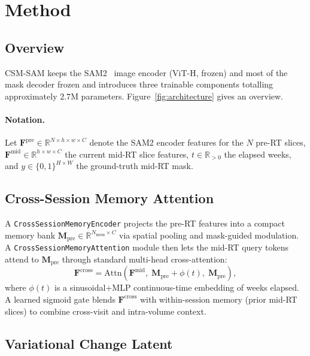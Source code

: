 \section{Method}
\label{sec:method}

\subsection{Overview}
\label{sec:method:overview}

CSM-SAM keeps the SAM2~\cite{ravi2024sam2} image encoder (ViT-H, frozen) and
most of the mask decoder frozen and introduces three trainable components
totalling approximately $2.7$M parameters.
Figure~\ref{fig:architecture} gives an overview.

\paragraph{Notation.}
Let $\mathbf{F}^{\text{pre}} \in \mathbb{R}^{N \times h \times w \times C}$
denote the SAM2 encoder features for the $N$ pre-RT slices,
$\mathbf{F}^{\text{mid}} \in \mathbb{R}^{h \times w \times C}$ the
current mid-RT slice features, $t \in \mathbb{R}_{>0}$ the elapsed weeks,
and $y \in \{0,1\}^{H \times W}$ the ground-truth mid-RT mask.

\subsection{Cross-Session Memory Attention}
\label{sec:method:csma}

A \texttt{CrossSessionMemoryEncoder} projects the pre-RT features into a
compact memory bank $\mathbf{M}_{\text{pre}} \in \mathbb{R}^{N_{\text{mem}} \times C}$
via spatial pooling and mask-guided modulation.  A
\texttt{CrossSessionMemoryAttention} module then lets the mid-RT query tokens
attend to $\mathbf{M}_{\text{pre}}$ through standard multi-head cross-attention:
\begin{equation}
  \mathbf{F}^{\text{cross}} = \mathrm{Attn}\!\left(
    \mathbf{F}^{\text{mid}},\;
    \mathbf{M}_{\text{pre}} + \phi(t),\;
    \mathbf{M}_{\text{pre}}
  \right),
\end{equation}
where $\phi(t)$ is a sinusoidal+MLP continuous-time embedding of weeks elapsed.
A learned sigmoid gate blends $\mathbf{F}^{\text{cross}}$ with within-session
memory (prior mid-RT slices) to combine cross-visit and intra-volume context.

\subsection{Variational Change Latent}
\label{sec:method:latent}

